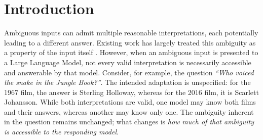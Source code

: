 

\section{Introduction}
\label{sec:introduction}

Ambiguous inputs can admit multiple reasonable interpretations, each potentially leading to a different answer. Existing work has largely treated this ambiguity as a property of the input itself \citep{min-etal-2020-ambigqa,NEURIPS2024_a4c942a8,cole-etal-2023-selectively, pmlr-v235-hou24b,liu-etal-2023-afraid, kim-etal-2023-tree, saparina2026reasoningintentambiguousrequests}. However, when an ambiguous input is presented to a Large Language Model, not every valid interpretation is necessarily accessible and answerable by that model. Consider, for example, the question \emph{``Who voiced the snake in the Jungle Book?''}. The intended adaptation is unspecified: for the 1967 film, the answer is Sterling Holloway, whereas for the 2016 film, it is Scarlett Johansson. While both interpretations are valid, one model may know both films and their answers, whereas another may know only one. The ambiguity inherent in the question remains unchanged; what changes is \emph{how much of that ambiguity is accessible to the responding model}. 


